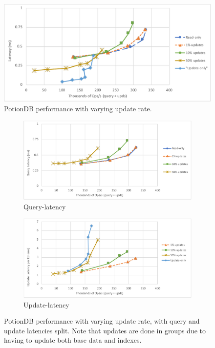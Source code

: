 \documentclass{vldb}
\begin{document}
\begin{figure}
	\centering
	\includegraphics[width=.95\linewidth]{update_rates_cut}
	\caption{PotionDB performance with varying update rate.}
	\label{fig:update_rates}
\end{figure}
\begin{figure}
	\centering
	\begin{subfigure}{.5\linewidth}
		\centering
		\includegraphics[width=.95\linewidth]{update_rates_query_cut}
		\caption{Query-latency}
		\label{fig:update_rates_query}
	\end{subfigure}%
	\begin{subfigure}{.5\linewidth}
		\centering
		\includegraphics[width=.95\linewidth]{update_rates_update_cut}
		\caption{Update-latency}
		\label{fig:update_rates_update}
	\end{subfigure}
	\caption{PotionDB performance with varying update rate, with query and update latencies split. Note that updates are done in groups due to having to update both base data and indexes.}
	\label{fig:update_rates_split}
\end{figure}
\end{document}
